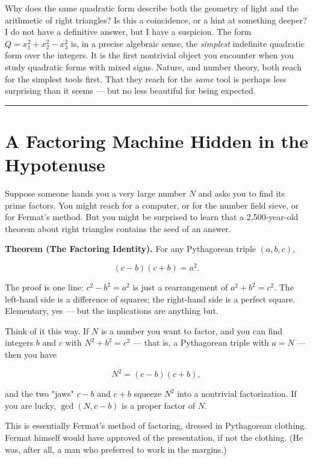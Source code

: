 \documentclass[11pt,openany]{book}
\theoremstyle{definition}
\theoremstyle{plain}
\theoremstyle{remark}
\begin{document}
Why does the same quadratic form describe both the geometry of light and the arithmetic of right triangles? Is this a coincidence, or a hint at something deeper? I do not have a definitive answer, but I have a suspicion. The form $Q = x_1^2 + x_2^2 - x_3^2$ is, in a precise algebraic sense, the \textit{simplest} indefinite quadratic form over the integers. It is the first nontrivial object you encounter when you study quadratic forms with mixed signs. Nature, and number theory, both reach for the simplest tools first. That they reach for the \textit{same} tool is perhaps less surprising than it seems — but no less beautiful for being expected.

\bigskip\noindent\rule{\textwidth}{0.4pt}\bigskip


\section*{A Factoring Machine Hidden in the Hypotenuse}


Suppose someone hands you a very large number $N$ and asks you to find its prime factors. You might reach for a computer, or for the number field sieve, or for Fermat's method. But you might be surprised to learn that a 2,500-year-old theorem about right triangles contains the seed of an answer.

\textbf{Theorem (The Factoring Identity).} For any Pythagorean triple $(a, b, c)$,

$$(c - b)(c + b) = a^2.$$

The proof is one line: $c^2 - b^2 = a^2$ is just a rearrangement of $a^2 + b^2 = c^2$. The left-hand side is a difference of squares; the right-hand side is a perfect square. Elementary, yes — but the implications are anything but.

Think of it this way. If $N$ is a number you want to factor, and you can find integers $b$ and $c$ with $N^2 + b^2 = c^2$ — that is, a Pythagorean triple with $a = N$ — then you have

$$N^2 = (c - b)(c + b),$$

and the two "jaws" $c - b$ and $c + b$ squeeze $N^2$ into a nontrivial factorization. If you are lucky, $\gcd(N, c - b)$ is a proper factor of $N$.

This is essentially Fermat's method of factoring, dressed in Pythagorean clothing. Fermat himself would have approved of the presentation, if not the clothing. (He was, after all, a man who preferred to work in the margins.)
\end{document}
